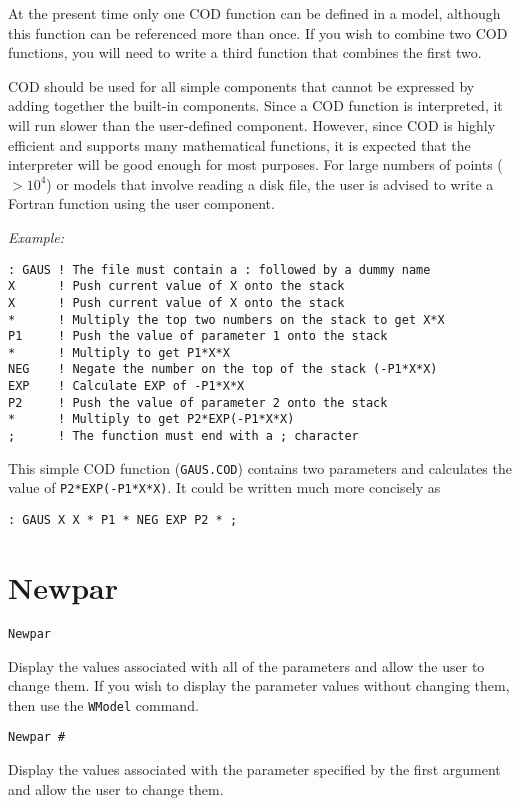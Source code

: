 At the present time only one COD function can be defined in a model,
although this function can be referenced more than once.  If you wish
to combine two COD functions, you will need to write a third function
that combines the first two.

COD should be used for all simple components that cannot be expressed
by adding together the built-in components.  Since a COD function
is interpreted, it will run slower than the user-defined component.
However, since COD is highly efficient and supports many mathematical
functions, it is expected that the interpreter will be good enough
for most purposes.  For large numbers of points ($> 10^4$) or models
that involve reading a disk file, the user is advised to write a Fortran
function using the user component.

\medskip\noindent
{\em Example:}
\begin{verbatim}
: GAUS ! The file must contain a : followed by a dummy name
X      ! Push current value of X onto the stack
X      ! Push current value of X onto the stack
*      ! Multiply the top two numbers on the stack to get X*X
P1     ! Push the value of parameter 1 onto the stack
*      ! Multiply to get P1*X*X
NEG    ! Negate the number on the top of the stack (-P1*X*X)
EXP    ! Calculate EXP of -P1*X*X
P2     ! Push the value of parameter 2 onto the stack
*      ! Multiply to get P2*EXP(-P1*X*X)
;      ! The function must end with a ; character
\end{verbatim}
This simple COD function ({\tt GAUS.COD}) contains two parameters and
calculates the value of {\tt P2*EXP(-P1*X*X)}.  It could be written much
more concisely as
\begin{verbatim}
: GAUS X X * P1 * NEG EXP P2 * ;
\end{verbatim}

\section*{Newpar}
\begin{verbatim}
Newpar
\end{verbatim}
   Display the values associated with all of the parameters and allow
the user to change them.  If you wish to display the parameter values
without changing them, then use the {\tt WModel} command.

\medskip
\begin{verbatim}
Newpar #
\end{verbatim}
   Display the values associated with the parameter specified by the
first argument and allow the user to change them.


